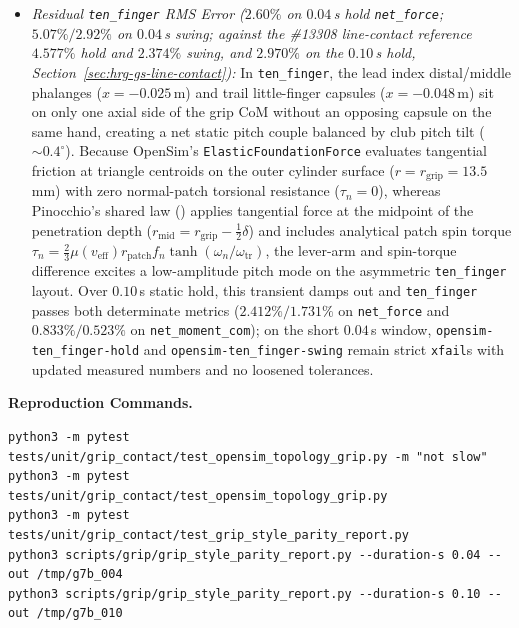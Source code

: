 \documentclass[11pt,a4paper]{article}
\begin{document}
\begin{itemize}[leftmargin=*,noitemsep]
\item \textit{Residual \texttt{ten\_finger} RMS Error ($2.60\%$ on $0.04$\,s hold \texttt{net\_force}; $5.07\% / 2.92\%$ on $0.04$\,s swing; against the \#13308 line-contact reference $4.577\%$ hold and $2.374\%$ swing, and $2.970\%$ on the $0.10$\,s hold, Section~\ref{sec:hrg-gs-line-contact}):} In \texttt{ten\_finger}, the lead index distal/middle phalanges ($x = -0.025$\,m) and trail little-finger capsules ($x = -0.048$\,m) sit on only one axial side of the grip CoM without an opposing capsule on the same hand, creating a net static pitch couple balanced by club pitch tilt ($\sim 0.4^\circ$). Because OpenSim's \texttt{ElasticFoundationForce} evaluates tangential friction at triangle centroids on the outer cylinder surface ($r = r_{\mathrm{grip}} = 13.5$\,mm) with zero normal-patch torsional resistance ($\tau_n = 0$), whereas Pinocchio's shared law () applies tangential force at the midpoint of the penetration depth ($r_{\mathrm{mid}} = r_{\mathrm{grip}} - \tfrac{1}{2}\delta$) and includes analytical patch spin torque $\tau_n = \tfrac{2}{3}\mu(v_{\mathrm{eff}}) r_{\mathrm{patch}} f_n \tanh(\omega_n / \omega_{\mathrm{tr}})$, the lever-arm and spin-torque difference excites a low-amplitude pitch mode on the asymmetric \texttt{ten\_finger} layout. Over $0.10$\,s static hold, this transient damps out and \texttt{ten\_finger} passes both determinate metrics ($2.412\% / 1.731\%$ on \texttt{net\_force} and $0.833\% / 0.523\%$ on \texttt{net\_moment\_com}); on the short $0.04$\,s window, \texttt{opensim-ten\_finger-hold} and \texttt{opensim-ten\_finger-swing} remain strict \texttt{xfail}s with updated measured numbers and no loosened tolerances.
\end{itemize}

\textbf{Reproduction Commands.}
\begin{verbatim}
python3 -m pytest tests/unit/grip_contact/test_opensim_topology_grip.py -m "not slow"
python3 -m pytest tests/unit/grip_contact/test_opensim_topology_grip.py
python3 -m pytest tests/unit/grip_contact/test_grip_style_parity_report.py
python3 scripts/grip/grip_style_parity_report.py --duration-s 0.04 --out /tmp/g7b_004
python3 scripts/grip/grip_style_parity_report.py --duration-s 0.10 --out /tmp/g7b_010
\end{verbatim}
\end{document}
